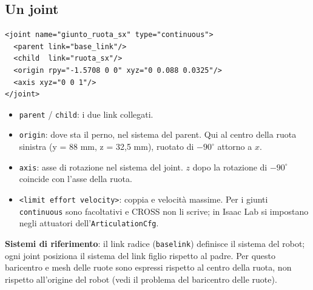 \documentclass[11pt,a4paper]{article}
\renewcommand{\_}{\oldunderscore\allowbreak}
\begin{document}
\subsection{Un joint}
\begin{lstlisting}
<joint name="giunto_ruota_sx" type="continuous">
  <parent link="base_link"/>
  <child  link="ruota_sx"/>
  <origin rpy="-1.5708 0 0" xyz="0 0.088 0.0325"/>
  <axis xyz="0 0 1"/>
</joint>
\end{lstlisting}
\begin{itemize}[leftmargin=*]
  \item \texttt{parent} / \texttt{child}: i due link collegati.
  \item \texttt{origin}: dove sta il perno, nel sistema del parent. Qui al centro della ruota sinistra
    (y = 88 mm, z = 32,5 mm), ruotato di $-90^\circ$ attorno a $x$.
  \item \texttt{axis}: asse di rotazione nel sistema del joint. $z$ dopo la rotazione di $-90^\circ$
    coincide con l'asse della ruota.
  \item \texttt{<limit effort velocity>}: coppia e velocit\`a massime. Per i giunti \texttt{continuous}
    sono facoltativi e CROSS non li scrive; in Isaac Lab si impostano negli attuatori
    dell'\texttt{ArticulationCfg}.
\end{itemize}

\textbf{Sistemi di riferimento}: il link radice (\texttt{base\_link}) definisce il sistema del robot;
ogni joint posiziona il sistema del link figlio rispetto al padre. Per questo baricentro e mesh delle ruote
sono espressi rispetto al centro della ruota, non rispetto all'origine del robot (vedi il problema
del baricentro delle ruote).
\end{document}
